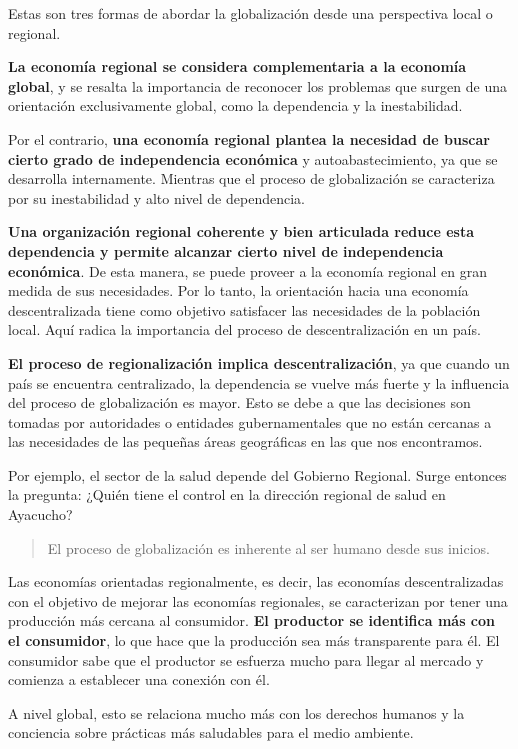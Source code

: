 \documentclass[
  a4paper,
]{article}
\begin{document}
Estas son tres formas de abordar la globalización desde una perspectiva
local o regional.

\textbf{La economía regional se considera complementaria a la economía
global}, y se resalta la importancia de reconocer los problemas que
surgen de una orientación exclusivamente global, como la dependencia y
la inestabilidad.

Por el contrario, \textbf{una economía regional plantea la necesidad de
buscar cierto grado de independencia económica} y autoabastecimiento, ya
que se desarrolla internamente. Mientras que el proceso de globalización
se caracteriza por su inestabilidad y alto nivel de dependencia.

\textbf{Una organización regional coherente y bien articulada reduce
esta dependencia y permite alcanzar cierto nivel de independencia
económica}. De esta manera, se puede proveer a la economía regional en
gran medida de sus necesidades. Por lo tanto, la orientación hacia una
economía descentralizada tiene como objetivo satisfacer las necesidades
de la población local. Aquí radica la importancia del proceso de
descentralización en un país.

\textbf{El proceso de regionalización implica descentralización}, ya que
cuando un país se encuentra centralizado, la dependencia se vuelve más
fuerte y la influencia del proceso de globalización es mayor. Esto se
debe a que las decisiones son tomadas por autoridades o entidades
gubernamentales que no están cercanas a las necesidades de las pequeñas
áreas geográficas en las que nos encontramos.

Por ejemplo, el sector de la salud depende del Gobierno Regional. Surge
entonces la pregunta: ¿Quién tiene el control en la dirección regional
de salud en Ayacucho?

\begin{quote}
El proceso de globalización es inherente al ser humano desde sus
inicios.
\end{quote}

Las economías orientadas regionalmente, es decir, las economías
descentralizadas con el objetivo de mejorar las economías regionales, se
caracterizan por tener una producción más cercana al consumidor.
\textbf{El productor se identifica más con el consumidor}, lo que hace
que la producción sea más transparente para él. El consumidor sabe que
el productor se esfuerza mucho para llegar al mercado y comienza a
establecer una conexión con él.

A nivel global, esto se relaciona mucho más con los derechos humanos y
la conciencia sobre prácticas más saludables para el medio ambiente.
\end{document}
